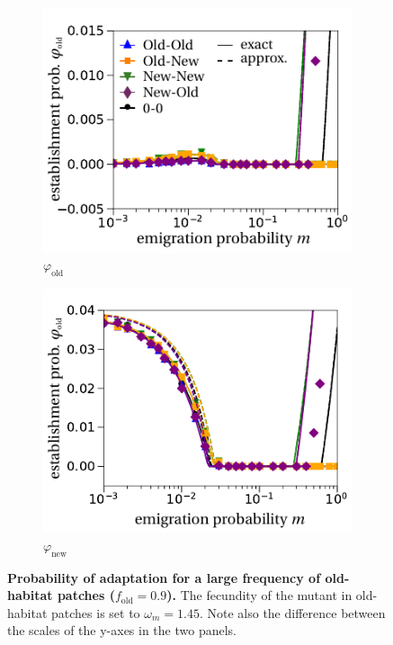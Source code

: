 \documentclass[a4paper,11pt]{scrartcl}
\begin{document}
\begin{figure}[h!]
	\centering
	\begin{subfigure}{.5\textwidth}
  		\centering
  		\includegraphics[width=\linewidth]{figS5a.pdf}
  		\caption{$\varphi_{\text{old}}$}
	\end{subfigure}%
	\begin{subfigure}{.5\textwidth}
 		 \centering
 		 \includegraphics[width=\linewidth]{figS5b.pdf}
  	\caption{$\varphi_{\text{new}}$}
	\end{subfigure}
	\caption{\textbf{Probability of adaptation for a large frequency of old-habitat patches ($f_{\text{old}}=0.9$).} The fecundity of the mutant in old-habitat patches is set to $\omega_m=1.45$. Note also the difference between the scales of the y-axes in the two panels.}
	\label{Sfig:vary_f}
\end{figure}
\end{document}
